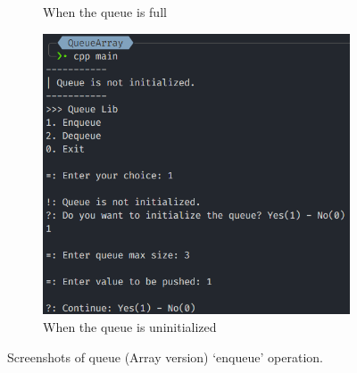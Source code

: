 \begin{figure}[!ht]
\begin{subfigure}{0.59\textwidth}
		\caption{When the queue is full}\label{fig:queue_arr_push_full}
	\end{subfigure}
	\hfill
	\begin{subfigure}{0.75\textwidth}
		\centering
		\includegraphics[width=\textwidth]{imgs/QueueArray/push/empty.png}
		\caption{When the queue is uninitialized}\label{fig:queue_arr_push_empty}
	\end{subfigure}
	\caption{Screenshots of queue (Array version) `enqueue' operation.}\label{fig:queue_arr_push_cases}
\end{figure}
